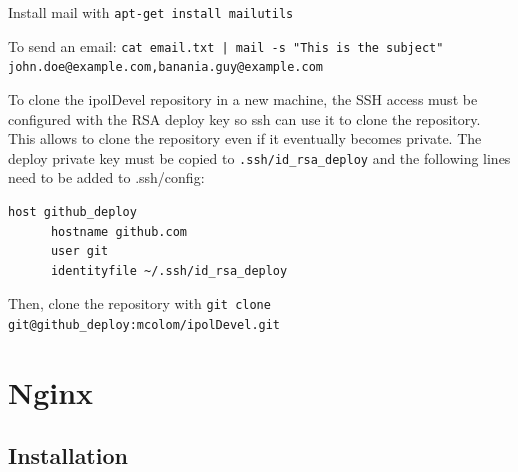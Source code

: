\documentclass[a4paper,12pt]{article}
\begin{document}
Install mail with {\tt apt-get install mailutils}

To send an email: {\tt cat email.txt | mail -s "This is the subject" john.doe@example.com,banania.guy@example.com}

To clone the ipolDevel repository in a new machine, the SSH access must be configured with the RSA deploy key so ssh can use it to clone the repository. This allows to clone the repository even if it eventually becomes private.
%
The deploy private key must be copied to {\tt .ssh/id\_rsa\_deploy} and the following lines need to be added to .ssh/config:

\begin{verbatim}
host github_deploy
      hostname github.com
      user git
      identityfile ~/.ssh/id_rsa_deploy
\end{verbatim}

Then, clone the repository with {\tt git clone git@github\_deploy:mcolom/ipolDevel.git}

\section{Nginx}

\subsection{Installation}
\end{document}

